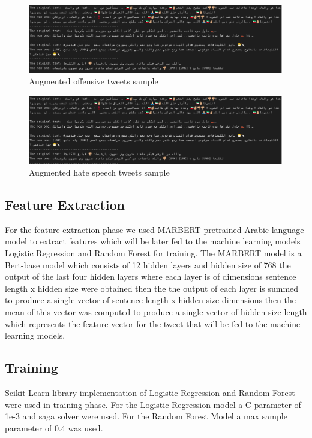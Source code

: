 \documentclass[10pt, a4paper]{article}
\begin{document}
\begin{figure}[htbp]
	\includegraphics[width=\columnwidth, height=0.11\paperheight]{05.png}
	\caption{Augmented offensive tweets sample}
	\label{fig:aug_off_tweets}
\end{figure}

\begin{figure}[htbp]
	\includegraphics[width=\columnwidth, height=0.11\paperheight]{05.png}
	\caption{Augmented hate speech tweets sample}
	\label{fig:aug_hate_tweets}
\end{figure}

\subsection{Feature Extraction}
For the feature extraction phase we used MARBERT pretrained Arabic language model to extract features which will be later fed to the machine learning models Logistic Regression and Random Forest for training. The MARBERT model is a Bert-base model which consists of 12 hidden layers and hidden size of 768 the output of the last four hidden layers where each layer is of dimensions sentence length x hidden size were obtained then the the output of each layer is summed to produce a single vector of sentence length x hidden size dimensions then the mean of this vector was computed to produce a single vector of hidden size length which represents the feature vector for the tweet that will be fed to the machine learning models.

\subsection{Training}
Scikit-Learn library implementation of Logistic Regression and Random Forest were used in training phase. For the Logistic Regression model a C parameter of 1e-3 and saga solver were used. For the Random Forest Model a max sample parameter of 0.4 was used.
\end{document}
